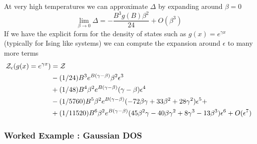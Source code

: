 %
At very high temperatures we can approximate $\Delta$ by expanding around $\beta=0$
\begin{equation}
  \lim_{\beta\rightarrow 0} \Delta =   -\frac{B^3 g(B) \beta^2}{24} + O(\beta^3)
\end{equation}
%
If we have the explicit form for the density of states such as $g(x) = e^{\gamma x}$ (typically for Ising like systems) we can compute the expansion around $\epsilon$ to many more terms
\begin{align}
\mathcal{Z}_\epsilon( g(x) = e^{\gamma x} ) &= \mathcal{Z} \\ \notag
&-
(1/24) B^3 e^{B(\gamma-\beta)}\beta^2 \epsilon^3 \\ \notag
&+
(1/48)B^4\beta^2e^{B(\gamma-\beta)}(\gamma-\beta)\epsilon^4 \\ \notag
&- 
(1/5760)B^5\beta^2e^{B(\gamma-\beta)}(-72\beta\gamma+33\beta^2+28\gamma^2)\epsilon^5+ \\ \notag
&+ 
(1/11520)B^6\beta^2e^{B(\gamma-\beta)}(45\beta^2\gamma-40\beta\gamma^2+8\gamma^3-13\beta^3)\epsilon^6
+ O(\epsilon^7)
\end{align}
%

\subsubsection{Worked Example : Gaussian DOS}

